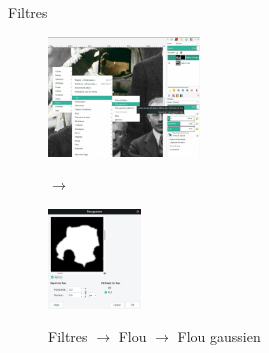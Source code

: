 	\begin{frame}{Filtres}
		\begin{figure}[H]
			\centering
			\begin{minipage}{.6\textwidth}
				\centering
				\includegraphics[height=120px]{Images/filters/astroBlur}
				\end{minipage}$\rightarrow$%
			\begin{minipage}{.4\textwidth}
				\centering
				\includegraphics[height=100px]{Images/filters/gaussBlur}
				\end{minipage}

Filtres $\rightarrow$ Flou $\rightarrow$ Flou gaussien
			\end{figure}
	\end{frame}


